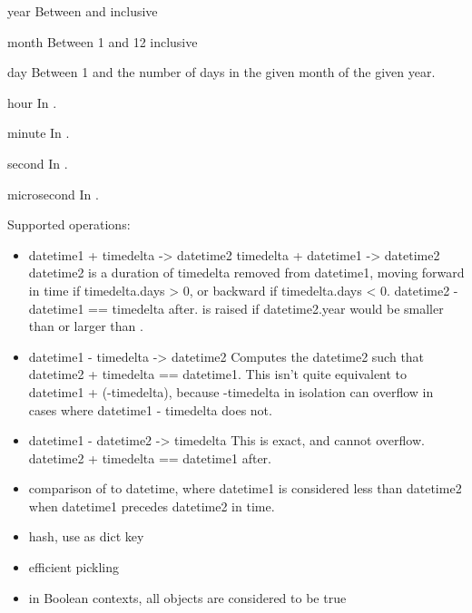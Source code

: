 \begin{memberdesc}{year}
  Between  and  inclusive
\end{memberdesc}

\begin{memberdesc}{month}
  Between 1 and 12 inclusive
\end{memberdesc}

\begin{memberdesc}{day}
  Between 1 and the number of days in the given month of the given
  year.
\end{memberdesc}

\begin{memberdesc}{hour}
  In .
\end{memberdesc}

\begin{memberdesc}{minute}
  In .
\end{memberdesc}

\begin{memberdesc}{second}
  In .
\end{memberdesc}

\begin{memberdesc}{microsecond}
  In .
\end{memberdesc}

Supported operations:

\begin{itemize}
  \item
    datetime1 + timedelta -> datetime2
    timedelta + datetime1 -> datetime2
    datetime2 is a duration of timedelta removed from datetime1, moving
    forward in time if timedelta.days > 0, or backward if
    timedelta.days < 0.  datetime2 - datetime1 == timedelta after.
     is raised if datetime2.year would be
    smaller than  or larger than .

  \item
    datetime1 - timedelta -> datetime2
    Computes the datetime2 such that datetime2 + timedelta == datetime1.
    This isn't quite equivalent to datetime1 + (-timedelta), because
    -timedelta in isolation can overflow in cases where
    datetime1 - timedelta does not.

  \item
    datetime1 - datetime2 -> timedelta
    This is exact, and cannot overflow.
    datetime2 + timedelta == datetime1 after.

  \item
    comparison of  to datetime, where datetime1 is
    considered less than datetime2 when datetime1 precedes datetime2
    in time.

  \item
    hash, use as dict key

  \item
    efficient pickling

  \item
    in Boolean contexts, all  objects are considered
    to be true
\end{itemize}

